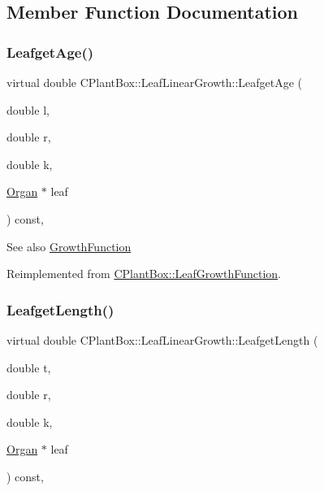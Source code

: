 \subsection{Member Function Documentation}
\mbox{\label{classCPlantBox_1_1LeafLinearGrowth_ab66497e86721f7ba08d89ab3a78582d9}} 
\subsubsection{\texorpdfstring{Leafget\+Age()}{LeafgetAge()}}
{\footnotesize\ttfamily virtual double C\+Plant\+Box\+::\+Leaf\+Linear\+Growth\+::\+Leafget\+Age (\begin{DoxyParamCaption}\item[{double}]{l,  }\item[{double}]{r,  }\item[{double}]{k,  }\item[{\hyperlink{classCPlantBox_1_1Organ}{Organ} $\ast$}]{leaf }\end{DoxyParamCaption}) const\hspace{0.3cm}{\ttfamily [inline]}, {\ttfamily [virtual]}}

\begin{DoxySeeAlso}{See also}
\hyperlink{classCPlantBox_1_1GrowthFunction}{Growth\+Function} 
\end{DoxySeeAlso}


Reimplemented from \hyperlink{classCPlantBox_1_1LeafGrowthFunction_a0893ec299fbd7566792e2ef9e2f58f2f}{C\+Plant\+Box\+::\+Leaf\+Growth\+Function}.

\mbox{\label{classCPlantBox_1_1LeafLinearGrowth_a46f07fae546309d050777f1b5350ecf0}} 
\subsubsection{\texorpdfstring{Leafget\+Length()}{LeafgetLength()}}
{\footnotesize\ttfamily virtual double C\+Plant\+Box\+::\+Leaf\+Linear\+Growth\+::\+Leafget\+Length (\begin{DoxyParamCaption}\item[{double}]{t,  }\item[{double}]{r,  }\item[{double}]{k,  }\item[{\hyperlink{classCPlantBox_1_1Organ}{Organ} $\ast$}]{leaf }\end{DoxyParamCaption}) const\hspace{0.3cm}{\ttfamily [inline]}, {\ttfamily [virtual]}}

